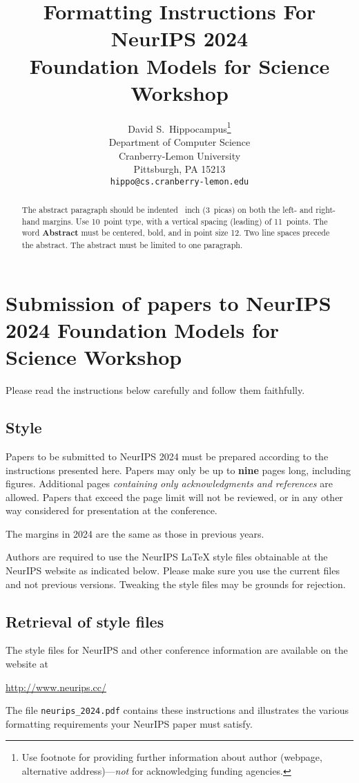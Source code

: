 \documentclass{article}
\title{Formatting Instructions For NeurIPS 2024 \\ Foundation Models for Science Workshop}
\author{%
  David S.~Hippocampus\thanks{Use footnote for providing further information
    about author (webpage, alternative address)---\emph{not} for acknowledging
    funding agencies.} \\
  Department of Computer Science\\
  Cranberry-Lemon University\\
  Pittsburgh, PA 15213 \\
  \texttt{hippo@cs.cranberry-lemon.edu} \\
}
\begin{document}
\maketitle


\begin{abstract}
  The abstract paragraph should be indented ~inch (3~picas) on
  both the left- and right-hand margins. Use 10~point type, with a vertical
  spacing (leading) of 11~points.  The word \textbf{Abstract} must be centered,
  bold, and in point size 12. Two line spaces precede the abstract. The abstract
  must be limited to one paragraph.
\end{abstract}


\section{Submission of papers to NeurIPS 2024 Foundation Models for Science Workshop}


Please read the instructions below carefully and follow them faithfully.


\subsection{Style}


Papers to be submitted to NeurIPS 2024 must be prepared according to the
instructions presented here. Papers may only be up to {\bf nine} pages long,
including figures. Additional pages \emph{containing only acknowledgments and
references} are allowed. Papers that exceed the page limit will not be
reviewed, or in any other way considered for presentation at the conference.


The margins in 2024 are the same as those in previous years.


Authors are required to use the NeurIPS \LaTeX{} style files obtainable at the
NeurIPS website as indicated below. Please make sure you use the current files
and not previous versions. Tweaking the style files may be grounds for
rejection.


\subsection{Retrieval of style files}

The style files for NeurIPS and other conference information are available on
the website at
\begin{center}
  \url{http://www.neurips.cc/}
\end{center}
The file \verb+neurips_2024.pdf+ contains these instructions and illustrates the
various formatting requirements your NeurIPS paper must satisfy.
\end{document}
